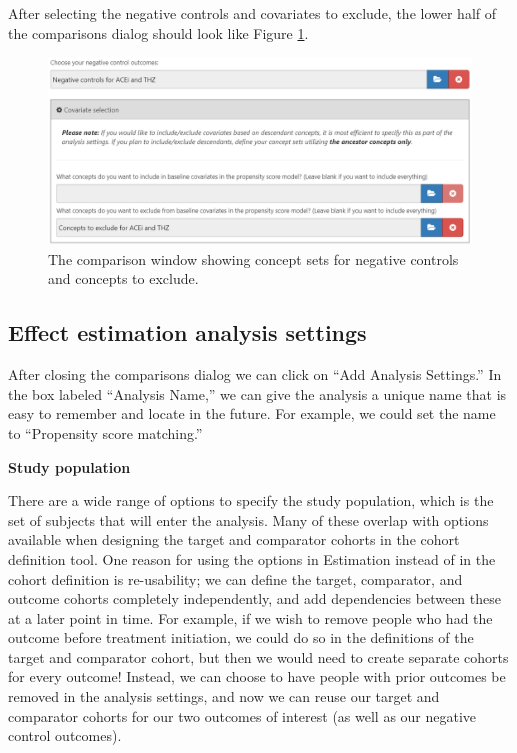 \documentclass[]{book}
\begin{document}
After selecting the negative controls and covariates to exclude, the lower half of the comparisons dialog should look like Figure \ref{fig:comparisons2}.

\begin{figure}

{\centering \includegraphics[width=1\linewidth]{images/PopulationLevelEstimation/comparisons2} 

}

\caption{The comparison window showing concept sets for negative controls and concepts to exclude.}\label{fig:comparisons2}
\end{figure}

\hypertarget{effect-estimation-analysis-settings}{%
\subsection{Effect estimation analysis settings}\label{effect-estimation-analysis-settings}}

After closing the comparisons dialog we can click on ``Add Analysis Settings.'' In the box labeled ``Analysis Name,'' we can give the analysis a unique name that is easy to remember and locate in the future. For example, we could set the name to ``Propensity score matching.''

\textbf{Study population}

There are a wide range of options to specify the study population, which is the set of subjects that will enter the analysis. Many of these overlap with options available when designing the target and comparator cohorts in the cohort definition tool. One reason for using the options in Estimation instead of in the cohort definition is re-usability; we can define the target, comparator, and outcome cohorts completely independently, and add dependencies between these at a later point in time. For example, if we wish to remove people who had the outcome before treatment initiation, we could do so in the definitions of the target and comparator cohort, but then we would need to create separate cohorts for every outcome! Instead, we can choose to have people with prior outcomes be removed in the analysis settings, and now we can reuse our target and comparator cohorts for our two outcomes of interest (as well as our negative control outcomes).
\end{document}
